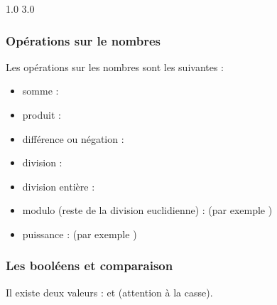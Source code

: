 \documentclass[letterpaper,10pt,english]{sphinxhowto}
\begin{document}
\begin{sphinxVerbatim}[commandchars=\\\{\}]
    
\end{sphinxVerbatim}

\begin{sphinxVerbatim}[commandchars=\\\{\}]
1.0
3.0
\end{sphinxVerbatim}


\subsubsection{Opérations sur le nombres}
\label{\detokenize{cours2_nombres_cours:operations-sur-le-nombres}}
\sphinxAtStartPar
Les opérations sur les nombres sont les suivantes :
\begin{itemize}
\item {} 
\sphinxAtStartPar
somme : \sphinxcode{\sphinxupquote{+}}

\item {} 
\sphinxAtStartPar
produit : \sphinxcode{\sphinxupquote{*}}

\item {} 
\sphinxAtStartPar
différence ou négation : \sphinxcode{\sphinxupquote{\sphinxhyphen{}}}

\item {} 
\sphinxAtStartPar
division : \sphinxcode{\sphinxupquote{/}}

\item {} 
\sphinxAtStartPar
division entière : \sphinxcode{\sphinxupquote{//}}

\item {} 
\sphinxAtStartPar
modulo (reste de la division euclidienne) : \sphinxcode{\sphinxupquote{\%}} (par exemple )

\item {} 
\sphinxAtStartPar
puissance : \sphinxcode{\sphinxupquote{**}} (par exemple )

\end{itemize}


\subsubsection{Les booléens et comparaison}
\label{\detokenize{cours2_nombres_cours:les-booleens-et-comparaison}}
\sphinxAtStartPar
Il existe deux valeurs :  et  (attention à la casse).
\end{document}
